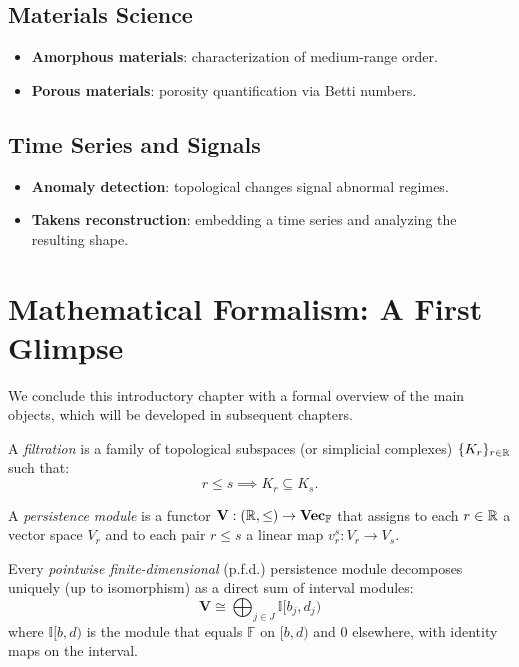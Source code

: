 \subsection{Materials Science}
\begin{itemize}
  \item \textbf{Amorphous materials}: characterization of medium-range
        order.
  \item \textbf{Porous materials}: porosity quantification via Betti
        numbers.
\end{itemize}

\subsection{Time Series and Signals}
\begin{itemize}
  \item \textbf{Anomaly detection}: topological changes signal
        abnormal regimes.
  \item \textbf{Takens reconstruction}: embedding a time series and
        analyzing the resulting shape.
\end{itemize}

\section{Mathematical Formalism: A First Glimpse}

We conclude this introductory chapter with a formal overview of the
main objects, which will be developed in subsequent chapters.

\begin{definition}[Filtration]
A \emph{filtration} is a family of topological subspaces (or simplicial
complexes) $\{K_r\}_{r \in \mathbb{R}}$ such that:
\[
  r \leq s \implies K_r \subseteq K_s.
\]
\end{definition}

\begin{definition}
A \emph{persistence module} is a functor
$\mathbf{V} : (\mathbb{R}, \leq) \to \mathbf{Vec}_\mathbb{F}$ that assigns to
each $r \in \mathbb{R}$ a vector space $V_r$ and to each pair $r \leq s$ a
linear map $v_r^s : V_r \to V_s$.
\end{definition}

\begin{theorem}
Every \emph{pointwise finite-dimensional} (p.f.d.) persistence module
decomposes uniquely (up to isomorphism) as a direct sum of interval
modules:
\[
  \mathbf{V} \cong \bigoplus_{j \in J} \mathbb{I}[b_j, d_j)
\]
where $\mathbb{I}[b,d)$ is the module that equals $\mathbb{F}$ on
$[b,d)$ and $0$ elsewhere, with identity maps on the interval.
\end{theorem}

